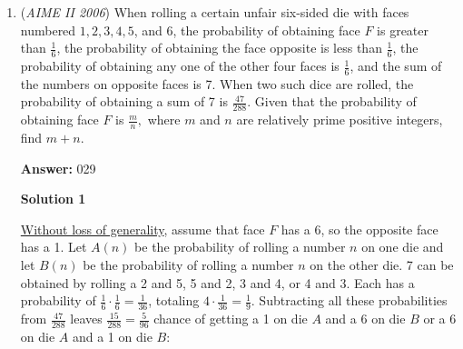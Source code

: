 \begin{enumerate}
\textbf{Solution 3}

Clearly, $a_6=1$, and either $a_1$ or $a_{12}$ is 12.

 
Case 1: $a_1 = 12$

 In this case, there are 4 empty spaces between $a_1$ and $a_6$, and 6 empty spaces between $a_6$ and $a_{12}$. $\binom{10}{4}$ is 210. This splits the remaining 10 numbers into two distinct sets that are automatically ordered. For this reason, there is no need to multiply by two to count doubles or treat as a permutation.

 
Case 2: $a_{12} = 12$

 In this case, there are 5 empty spaces between $a_1$ and $a_6$, and 5 empty spaces between $a_6$ and $a_{12}$. $\binom{10}{5}$ is 252. Like last time, this splits the remaining 10 numbers into two distinct sets that are automatically ordered. It is important to realize that the two sets are distinct because one side has 12 and the other does not. There is no need to multiply by two.

 $210 + 252 = \boxed{462}$ ordered 12-tuples.

 
-jackshi2006

 


	\item (\textit{AIME II 2006}) When rolling a certain unfair six-sided die with faces numbered $1, 2, 3, 4, 5$, and $6$, the probability of obtaining face $F$ is greater than $\frac{1}{6}$, the probability of obtaining the face opposite is less than $\frac{1}{6}$, the probability of obtaining any one of the other four faces is $\frac{1}{6}$, and the sum of the numbers on opposite faces is 7. When two such dice are rolled, the probability of obtaining a sum of 7 is $\frac{47}{288}$. Given that the probability of obtaining face $F$  is $\frac{m}{n},$ where $m$ and $n$ are relatively prime positive integers, find $m+n.$

 \textbf{Answer: }029



\textbf{Solution 1}

\href{https://artofproblemsolving.com/wiki/index.php?title=Without\_loss\_of\_generality}{Without loss of generality}, assume that face $F$ has a 6, so the opposite face has a 1.  Let $A(n)$ be the probability of rolling a number $n$ on one die and let $B(n)$ be the probability of rolling a number $n$ on the other die. 7 can be obtained by rolling a 2 and 5, 5 and 2, 3 and 4, or 4 and 3. Each has a probability of $\frac{1}{6} \cdot \frac{1}{6} = \frac{1}{36}$, totaling $4 \cdot \frac{1}{36} = \frac{1}{9}$. Subtracting all these probabilities from $\frac{47}{288}$ leaves $\frac{15}{288}=\frac{5}{96}$ chance of getting a 1 on die $A$ and a 6 on die $B$ or a 6 on die $A$ and a 1 on die $B$:


\end{enumerate}
